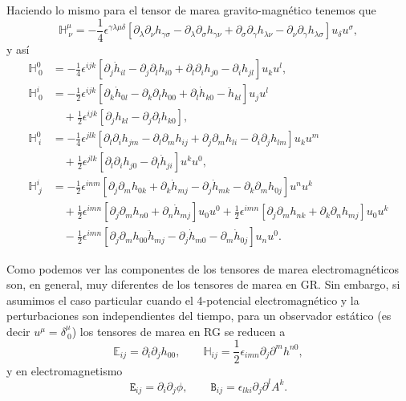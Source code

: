 Haciendo lo mismo para el tensor de marea gravito-magnético tenemos que
\begin{equation}
\mathbb{H}^{\mu}_{\ \nu} = -\frac{1}{4} \epsilon^{\gamma \lambda \mu \delta} \left[ \partial_{\lambda} \partial_{\nu} h_{\gamma \sigma} - \partial_{\lambda} \partial_{\sigma} h_{\gamma \nu} + \partial_{\sigma} \partial_{\gamma} h_{\lambda \nu} - \partial_{\nu} \partial_{\gamma} h_{\lambda \sigma} \right] u_{\delta} u^{\sigma},
\end{equation} 
y así
\begin{align}
\mathbb{H}^{0}_{\ 0} &= -\frac{1}{4} \epsilon^{ijk} \left[ \partial_j \dot{h}_{il} - \partial_{j} \partial_l h_{i0} + \partial_l \partial_i h_{j0} -  \partial_i h_{jl} \right] u_k u^l, \\
\nonumber
\mathbb{H}^{i}_{\ 0} &= -\frac{1}{2} \epsilon^{ijk} \left[ \partial_k \dot{h}_{0l} - \partial_k \partial_l h_{00} + \partial_l \dot{h}_{k0} - \ddot{h}_{kl} \right] u_j u^l \\
& \quad + \frac{1}{2} \epsilon^{ijk} \left[ \partial_j h_{kl} - \partial_j \partial_l h_{k0} \right],\\
\nonumber
\mathbb{H}^{0}_{\ i} &= -\frac{1}{4} \epsilon^{jlk} \left[ \partial_l \partial_i h_{jm} - \partial_l \partial_m h_{ij} + \partial_j \partial_m h_{li} - \partial_i \partial_j h_{lm} \right] u_k u^m \\
& \quad + \frac{1}{2} \epsilon^{jlk} \left[ \partial_l \partial_i h_{j0} - \partial_l \dot{h}_{ji} \right] u^k u^0,\\
\nonumber
\mathbb{H}^{i}_{\ j} &= -\frac{1}{2} \epsilon^{inm} \left[ \partial_j \partial_m h_{0k} + \partial_k \dot{h}_{mj} - \partial_j \dot{h}_{mk} - \partial_k \partial_m h_{0j} \right] u^n u^k \\
\nonumber
& \quad + \frac{1}{2} \epsilon^{imn} \left[ \partial_j \partial_m h_{n0} + \partial_n \dot{h}_{mj} \right] u_0 u^0 
+ \frac{1}{2} \epsilon^{imn} \left[ \partial_j \partial_m h_{nk} + \partial_k \partial_n h_{mj} \right]
u_0 u^k \\
& \quad - \frac{1}{2} \epsilon^{imn} \left[ \partial_j \partial_m h_{00} \ddot{h}_{mj} - \partial_j \dot{h}_{m0} - \partial_m \dot{h}_{0j} \right] u_n u^0.
\end{align}

Como podemos ver las componentes de los tensores de marea electromagnéticos son, en general, muy diferentes de los tensores de marea en GR. Sin embargo, si asumimos el caso particular cuando el 4-potencial electromagnético y la perturbaciones son independientes del tiempo, para un observador estático (es decir $u^{\mu} = \delta^{\mu}_{\ 0}$) los tensores de marea en RG se reducen a
\begin{equation}
\label{eq:60}
\mathbb{E}_{ij} = \partial_i \partial_j h_{00}, \qquad \mathbb{H}_{ij} = \frac{1}{2} \epsilon_{imn} \partial_j \partial^m h^{n0},
\end{equation}
y en electromagnetismo
\begin{equation}
\label{eq:61}
\mathtt{E}_{ij} = \partial_i \partial_j \phi, \qquad \mathtt{B}_{ij} = \epsilon_{lki} \partial_j \partial^l A^k. 
\end{equation}

